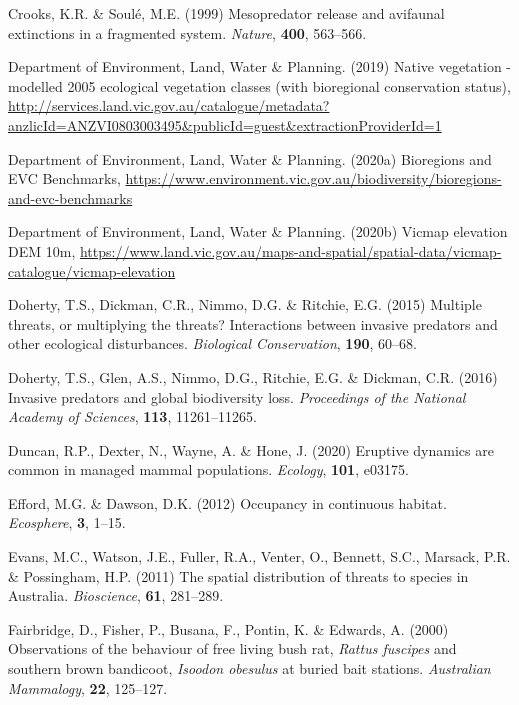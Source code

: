 \documentclass[]{elsarticle} %
\begin{document}
\leavevmode\hypertarget{ref-crooks1999mesopredator}{}%
Crooks, K.R. \& Soulé, M.E. (1999) Mesopredator release and avifaunal extinctions in a fragmented system. \emph{Nature}, \textbf{400}, 563--566.

\leavevmode\hypertarget{ref-NV2005_EVCBCS}{}%
Department of Environment, Land, Water \& Planning. (2019) Native vegetation - modelled 2005 ecological vegetation classes (with bioregional conservation status), \url{http://services.land.vic.gov.au/catalogue/metadata?anzlicId=ANZVI0803003495\&publicId=guest\&extractionProviderId=1}

\leavevmode\hypertarget{ref-delwp2020bioregions}{}%
Department of Environment, Land, Water \& Planning. (2020a) Bioregions and EVC Benchmarks, \url{https://www.environment.vic.gov.au/biodiversity/bioregions-and-evc-benchmarks}

\leavevmode\hypertarget{ref-delwp2020elevation}{}%
Department of Environment, Land, Water \& Planning. (2020b) Vicmap elevation DEM 10m, \url{https://www.land.vic.gov.au/maps-and-spatial/spatial-data/vicmap-catalogue/vicmap-elevation}

\leavevmode\hypertarget{ref-doherty2015multiple}{}%
Doherty, T.S., Dickman, C.R., Nimmo, D.G. \& Ritchie, E.G. (2015) Multiple threats, or multiplying the threats? Interactions between invasive predators and other ecological disturbances. \emph{Biological Conservation}, \textbf{190}, 60--68.

\leavevmode\hypertarget{ref-doherty2016invasive}{}%
Doherty, T.S., Glen, A.S., Nimmo, D.G., Ritchie, E.G. \& Dickman, C.R. (2016) Invasive predators and global biodiversity loss. \emph{Proceedings of the National Academy of Sciences}, \textbf{113}, 11261--11265.

\leavevmode\hypertarget{ref-duncan2020eruptive}{}%
Duncan, R.P., Dexter, N., Wayne, A. \& Hone, J. (2020) Eruptive dynamics are common in managed mammal populations. \emph{Ecology}, \textbf{101}, e03175.

\leavevmode\hypertarget{ref-efford2012occupancy}{}%
Efford, M.G. \& Dawson, D.K. (2012) Occupancy in continuous habitat. \emph{Ecosphere}, \textbf{3}, 1--15.

\leavevmode\hypertarget{ref-evans2011spatial}{}%
Evans, M.C., Watson, J.E., Fuller, R.A., Venter, O., Bennett, S.C., Marsack, P.R. \& Possingham, H.P. (2011) The spatial distribution of threats to species in Australia. \emph{Bioscience}, \textbf{61}, 281--289.

\leavevmode\hypertarget{ref-fairbridge2000observations}{}%
Fairbridge, D., Fisher, P., Busana, F., Pontin, K. \& Edwards, A. (2000) Observations of the behaviour of free living bush rat, \emph{Rattus fuscipes} and southern brown bandicoot, \emph{Isoodon obesulus} at buried bait stations. \emph{Australian Mammalogy}, \textbf{22}, 125--127.
\end{document}
